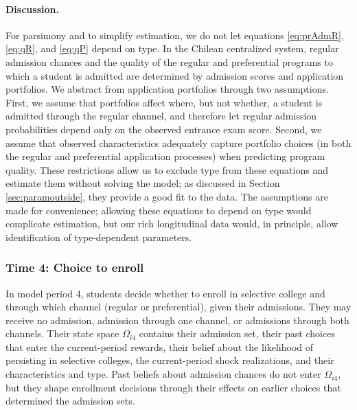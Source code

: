 \paragraph{Discussion.} 
For parsimony and to simplify estimation, we do not let equations \eqref{eq:prAdmR}, \eqref{eq:qR}, and \eqref{eq:qP} depend on type. In the Chilean centralized system, regular admission chances and the quality of the regular and preferential programs to which a student is admitted are determined by admission scores and application portfolios. We abstract from application portfolios through two assumptions. First, we assume that portfolios affect where, but not whether, a student is admitted through the regular channel, and therefore let regular admission probabilities depend only on the observed entrance exam score. Second, we assume that observed characteristics adequately capture portfolio choices (in both the regular and preferential application processes) when predicting program quality.
These restrictions allow us to exclude type from these equations and estimate them without solving the model; as discussed in Section \ref{sec:paramoutside}, they provide a good fit to the data. The assumptions are made for convenience; allowing these equations to depend on type would complicate estimation, but our rich longitudinal data would, in principle, allow identification of type-dependent parameters.\par








\subsubsection{Time 4: Choice to enroll}\label{sec:time4enroll}

In model period 4, students decide whether to enroll in selective college and through which channel (regular or preferential), given their admissions. They may receive no admission, admission through one channel, or admissions through both channels. Their state space $\Omega_{i4}$ contains their admission set, their past choices that enter the current-period rewards, their belief about the likelihood of persisting in selective colleges, the current-period shock realizations, and their characteristics and type. Past beliefs about admission chances do not enter $\Omega_{i4}$, but they shape enrollment decisions through their effects on earlier choices that determined the admission sets. \par 

